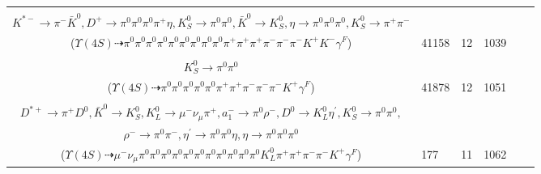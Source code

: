 \documentclass[landscape]{article}
\newcounter{rownumbers}
\newcommand\rn{\stepcounter{rownumbers}\arabic{rownumbers}}
\newcommand{\EOLP}{\\ \hline} %
\newcommand{\topoTags}[1]{#1} %
\begin{document}
\begin{longtable}{clcccc}
\rn & \makecell[l]{ $ 
\Upsilon(4S) \rightarrow \bar{B}^{0} \bar{B}^{0} ,
\bar{B}^{0} \rightarrow K^{*} \bar{K}^{*} ,
\bar{B}^{0} \rightarrow \pi^{0} K^{0} K^{*-} D^{+} ,
K^{*} \rightarrow \pi^{-} K^{+} \gamma^{F} ,
\bar{K}^{*} \rightarrow \pi^{+} K^{-} ,
K^{0} \rightarrow K_{S}^{0} ,
$ \\ $
K^{*-} \rightarrow \pi^{-} \bar{K}^{0} ,
D^{+} \rightarrow \pi^{0} \pi^{0} \pi^{0} \pi^{+} \eta ,
K_{S}^{0} \rightarrow \pi^{0} \pi^{0} ,
\bar{K}^{0} \rightarrow K_{S}^{0} ,
\eta \rightarrow \pi^{0} \pi^{0} \pi^{0} ,
K_{S}^{0} \rightarrow \pi^{+} \pi^{-} 
$ \\ ($
\Upsilon(4S) \dashrightarrow \pi^{0} \pi^{0} \pi^{0} \pi^{0} \pi^{0} \pi^{0} \pi^{0} \pi^{0} \pi^{0} \pi^{+} \pi^{+} \pi^{+} \pi^{-} \pi^{-} \pi^{-} K^{+} K^{-} \gamma^{F} 
$) } & \topoTags{41158 & }12 & 1039 \EOLP

\rn & \makecell[l]{ $ 
\Upsilon(4S) \rightarrow B^{0} \bar{B}^{0} ,
B^{0} \rightarrow \pi^{+} \eta D^{-} ,
\bar{B}^{0} \rightarrow \pi^{-} D^{+} \gamma^{F} ,
\eta \rightarrow \pi^{0} \pi^{0} \pi^{0} ,
D^{-} \rightarrow \pi^{-} \pi^{-} K^{+} ,
D^{+} \rightarrow \pi^{+} K_{S}^{0} ,
$ \\ $
K_{S}^{0} \rightarrow \pi^{0} \pi^{0} 
$ \\ ($
\Upsilon(4S) \dashrightarrow \pi^{0} \pi^{0} \pi^{0} \pi^{0} \pi^{0} \pi^{+} \pi^{+} \pi^{-} \pi^{-} \pi^{-} K^{+} \gamma^{F} 
$) } & \topoTags{41878 & }12 & 1051 \EOLP

\rn & \makecell[l]{ $ 
\Upsilon(4S) \rightarrow B^{0} \bar{B}^{0} ,
B^{0} \rightarrow \pi^{-} K_{0}^{*+} \gamma^{F} ,
\bar{B}^{0} \rightarrow \bar{K}^{*} D^{-} D^{*+} ,
K_{0}^{*+} \rightarrow \pi^{0} K^{+} ,
\bar{K}^{*} \rightarrow \pi^{0} \bar{K}^{0} ,
D^{-} \rightarrow K_{L}^{0} a_{1}^{-} ,
$ \\ $
D^{*+} \rightarrow \pi^{+} D^{0} ,
\bar{K}^{0} \rightarrow K_{S}^{0} ,
K_{L}^{0} \rightarrow \mu^{-} \nu_{\mu} \pi^{+} ,
a_{1}^{-} \rightarrow \pi^{0} \rho^{-} ,
D^{0} \rightarrow K_{L}^{0} \eta^{\prime} ,
K_{S}^{0} \rightarrow \pi^{0} \pi^{0} ,
$ \\ $
\rho^{-} \rightarrow \pi^{0} \pi^{-} ,
\eta^{\prime} \rightarrow \pi^{0} \pi^{0} \eta ,
\eta \rightarrow \pi^{0} \pi^{0} \pi^{0} 
$ \\ ($
\Upsilon(4S) \dashrightarrow \mu^{-} \nu_{\mu} \pi^{0} \pi^{0} \pi^{0} \pi^{0} \pi^{0} \pi^{0} \pi^{0} \pi^{0} \pi^{0} \pi^{0} \pi^{0} K_{L}^{0} \pi^{+} \pi^{+} \pi^{-} \pi^{-} K^{+} \gamma^{F} 
$) } & \topoTags{177 & }11 & 1062 \EOLP


\end{longtable}
\end{document}
